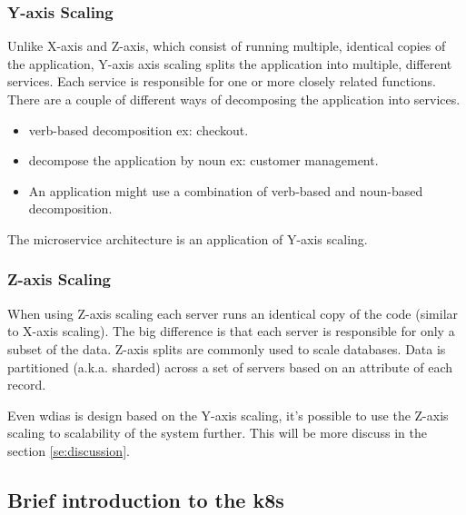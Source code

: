 \subsubsection{Y-axis Scaling}
Unlike X-axis and Z-axis, which consist of running multiple, identical copies of the application, Y-axis axis scaling splits the application into multiple, different services. Each service is responsible for one or more closely related functions. There are a couple of different ways of decomposing the application into services.
\begin{itemize}
    \item verb-based decomposition ex: checkout.
    \item decompose the application by noun ex: customer management. 
    \item An application might use a combination of verb-based and noun-based decomposition.
\end{itemize}
    
The microservice architecture is an application of Y-axis scaling.

\subsubsection{Z-axis Scaling}
When using Z-axis scaling each server runs an identical copy of the code (similar to X-axis scaling). The big difference is that each server is responsible for only a subset of the data. 
Z-axis splits are commonly used to scale databases. Data is partitioned (a.k.a. sharded) across a set of servers based on an attribute of each record.

Even \acrshort{wdias} is design based on the Y-axis scaling, it's possible to use the Z-axis scaling to scalability of the system further. This will be more discuss in the section \ref{se:discussion}.

\subsection{Brief introduction to the \acrfull{k8s}}
\label{sebse:k8s_intro}

